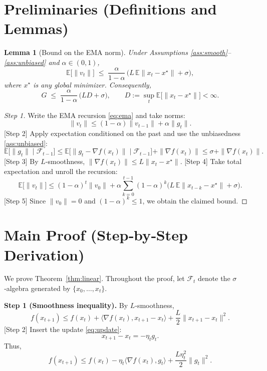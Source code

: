 \documentclass{article}
\newtheorem{lemma}{Lemma}
\newcommand{\E}{\mathbb{E}}
\begin{document}
\newpage
\section*{Preliminaries (Definitions and Lemmas)}
\begin{lemma}[Bound on the EMA norm]\label{lem:boundG}
Under Assumptions \ref{ass:smooth}–\ref{ass:unbiased} and $\alpha\in(0,1)$,
\[
    \E\!\bigl[\|v_{t}\|\bigr]\;\le\; \frac{\alpha}{1-\alpha}\,\bigl(L\,\E\!\|x_{t}-x^{\star}\|+\sigma\bigr),
\]
where $x^{\star}$ is any global minimizer. Consequently,
\[
    G\;\le\;\frac{\alpha}{1-\alpha}\,\bigl(L D+\sigma\bigr),\qquad 
    D:=\sup_{t}\E\!\bigl[\|x_{t}-x^{\star}\|\bigr] <\infty .
\]
\end{lemma}
\begin{proof}
[Step 1] Write the EMA recursion \eqref{eq:ema} and take norms:
\[
    \|v_{t}\|\le (1-\alpha)\|v_{t-1}\|+\alpha\|g_{t}\|.
\]
[Step 2] Apply expectation conditioned on the past and use the unbiasedness \eqref{ass:unbiased}:
\[
    \E\!\bigl[\|g_{t}\|\mid\mathcal{F}_{t-1}\bigr]
    \le \E\!\bigl[\|g_{t}-\nabla f(x_{t})\|\mid\mathcal{F}_{t-1}\bigr]
        +\|\nabla f(x_{t})\|
    \le \sigma+\|\nabla f(x_{t})\|.
\]
[Step 3] By $L$‑smoothness, $\|\nabla f(x_{t})\|\le L\|x_{t}-x^{\star}\|$.
[Step 4] Take total expectation and unroll the recursion:
\[
    \E\!\bigl[\|v_{t}\|\bigr]\le (1-\alpha)^{t}\|v_{0}\|
        +\alpha\sum_{k=0}^{t-1}(1-\alpha)^{k}\bigl(L\,\E\!\|x_{t-k}-x^{\star}\|+\sigma\bigr).
\]
[Step 5] Since $\|v_{0}\|=0$ and $(1-\alpha)^{k}\le1$, we obtain the claimed bound.
\end{proof}

\section*{Main Proof (Step‑by‑Step Derivation)}
We prove Theorem~\ref{thm:linear}. Throughout the proof, let $\mathcal{F}_{t}$ denote the $\sigma$‑algebra generated by $\{x_{0},\dots,x_{t}\}$.

\noindent\textbf{Step 1 (Smoothness inequality).}  
By $L$‑smoothness,
\begin{equation}
    f(x_{t+1})\le f(x_{t})+\langle\nabla f(x_{t}),x_{t+1}-x_{t}\rangle
        +\frac{L}{2}\|x_{t+1}-x_{t}\|^{2}.
    \label{eq:smooth}
\end{equation}
[Step 2] Insert the update \eqref{eq:update}:
\[
    x_{t+1}-x_{t}= -\eta_{t}g_{t}.
\]
Thus,
\[
    f(x_{t+1})\le f(x_{t}) -\eta_{t}\langle\nabla f(x_{t}),g_{t}\rangle
        +\frac{L\eta_{t}^{2}}{2}\|g_{t}\|^{2}.
    \tag{2.1}
\]
\end{document}
